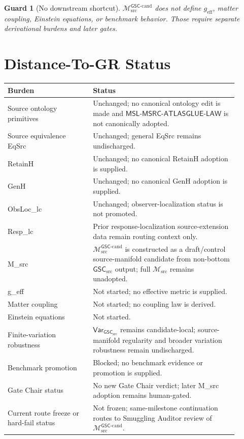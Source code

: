 \documentclass[11pt]{article}
\newcommand{\Msrc}{\mathcal{M}_{\mathrm{src}}}
\newcommand{\Mgsccand}{\mathcal{M}_{\mathrm{src}}^{\mathsf{GSC}\text{-}\mathrm{cand}}}
\newcommand{\geff}{g_{\mathrm{eff}}}
\newcommand{\GSC}{\mathsf{GSC}_{\mathrm{src}}}
\newcommand{\Vargsc}{\mathsf{Var}_{\GSC}}
\newcommand{\MSL}{\mathsf{MSL}\mbox{-}\mathsf{MSRC}\mbox{-}\mathsf{ATLASGLUE}\mbox{-}\mathsf{LAW}}
\newtheorem{guard}{Guard}
\begin{document}
\begin{guard}[No downstream shortcut]
\(\Mgsccand\) does not define \(\geff\), matter coupling, Einstein equations,
or benchmark behavior. Those require separate derivational burdens and later
gates.
\end{guard}

\section{Distance-To-GR Status}

\begin{center}
\begin{tabular}{p{0.33\linewidth}p{0.57\linewidth}}
\hline
Burden & Status \\
\hline
Source ontology primitives & Unchanged; no canonical ontology edit is made and \(\MSL\) is not canonically adopted. \\
Source equivalence EqSrc & Unchanged; general EqSrc remains undischarged. \\
RetainH & Unchanged; no canonical RetainH adoption is supplied. \\
GenH & Unchanged; no canonical GenH adoption is supplied. \\
ObsLoc\_lc & Unchanged; observer-localization status is not promoted. \\
Resp\_lc & Prior response-localization source-extension data remain routing context only. \\
M\_src & \(\Mgsccand\) is constructed as a draft/control source-manifold candidate from non-bottom \(\GSC\) output; full \(\Msrc\) remains unadopted. \\
g\_eff & Not started; no effective metric is supplied. \\
Matter coupling & Not started; no coupling law is derived. \\
Einstein equations & Not started. \\
Finite-variation robustness & \(\Vargsc\) remains candidate-local; source-manifold regularity and broader variation robustness remain undischarged. \\
Benchmark promotion & Blocked; no benchmark evidence or promotion is supplied. \\
Gate Chair status & No new Gate Chair verdict; later M\_src adoption remains human-gated. \\
Current route freeze or hard-fail status & Not frozen; same-milestone continuation routes to Smuggling Auditor review of \(\Mgsccand\). \\
\hline
\end{tabular}
\end{center}
\end{document}
